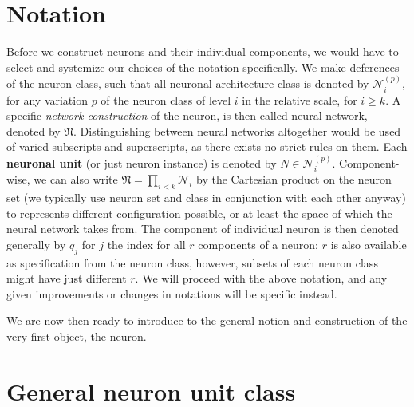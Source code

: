 \section{Notation}
Before we construct neurons and their individual components, we would have to select and systemize our choices of the notation specifically. We make deferences of the neuron class, such that all neuronal architecture class is denoted by $\mathcal{N}_{i}^{(p)}$, for any variation $p$ of the neuron class of level $i$ in the relative scale, for $i\geq k$. A specific \textit{network construction} of the neuron, is then called neural network, denoted by $\mathfrak{N}$. Distinguishing between neural networks altogether would be used of varied subscripts and superscripts, as there exists no strict rules on them. Each \textbf{neuronal unit} (or just neuron instance) is denoted by $N\in \mathcal{N}_{i}^{(p)}$. Component-wise, we can also write $\mathfrak{N}=\prod_{i< k} \mathcal{N}_{i}$ by the Cartesian product on the neuron set (we typically use neuron set and class in conjunction with each other anyway) to represents different configuration possible, or at least the space of which the neural network takes from. The component of individual neuron is then denoted generally by $q_{j}$ for $j$ the index for all $r$ components of a neuron; $r$ is also available as specification from the neuron class, however, subsets of each neuron class might have just different $r$. We will proceed with the above notation, and any given improvements or changes in notations will be specific instead. 

We are now then ready to introduce to the general notion and construction of the very first object, the neuron. 
\section{General neuron unit class}


